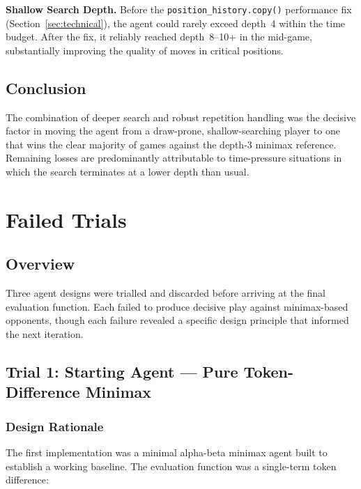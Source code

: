 \documentclass[10.5pt,a4paper]{article}
\begin{document}
\textbf{Shallow Search Depth.}
Before the \texttt{position\_history.copy()} performance fix (Section~\ref{sec:technical}), the agent could rarely exceed depth~4 within the time budget. After the fix, it reliably reached depth~8--10+ in the mid-game, substantially improving the quality of moves in critical positions.

\subsection{Conclusion}

The combination of deeper search and robust repetition handling was the decisive factor in moving the agent from a draw-prone, shallow-searching player to one that wins the clear majority of games against the depth-3 minimax reference. Remaining losses are predominantly attributable to time-pressure situations in which the search terminates at a lower depth than usual.

\section{Failed Trials}
\label{sec:failed}

\subsection{Overview}

Three agent designs were trialled and discarded before arriving at the final evaluation function. Each failed to produce decisive play against minimax-based opponents, though each failure revealed a specific design principle that informed the next iteration.

\subsection{Trial 1: Starting Agent --- Pure Token-Difference Minimax}

\subsubsection{Design Rationale}

The first implementation was a minimal alpha-beta minimax agent built to establish a working baseline. The evaluation function was a single-term token difference:
\end{document}
